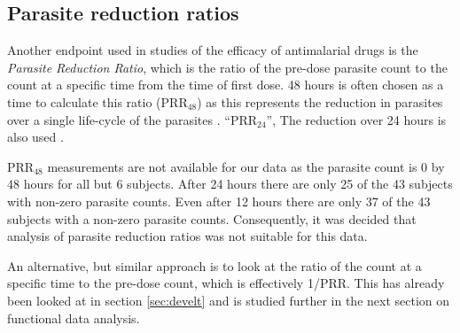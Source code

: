 \subsection{Parasite reduction ratios}
Another endpoint used in studies of the efficacy of antimalarial drugs is the \emph{Parasite Reduction Ratio}, which is the ratio of the pre-dose parasite count to the count at a specific time from the time of first dose. 48 hours is often chosen as a time to calculate this ratio (PRR$_{48}$) as this represents the reduction in parasites over a single life-cycle of the parasites \cite{white}. ``PRR$_{24}$'', The reduction over 24 hours is also used \cite{newton}.

PRR$_{48}$ measurements are not available for our data as the parasite count is 0 by 48 hours for all but 6 subjects. After 24 hours there are only 25 of the 43 subjects with non-zero parasite counts. Even after 12 hours there are only 37 of the 43 subjects with a non-zero parasite counts. Consequently, it was decided that analysis of parasite reduction ratios was not suitable for this data.

An alternative, but similar approach is to look at the ratio of the count at a specific time to the pre-dose count, which is effectively 1/PRR. This has already been looked at in section \ref{sec:develt} and is studied further in the next section on functional data analysis.


